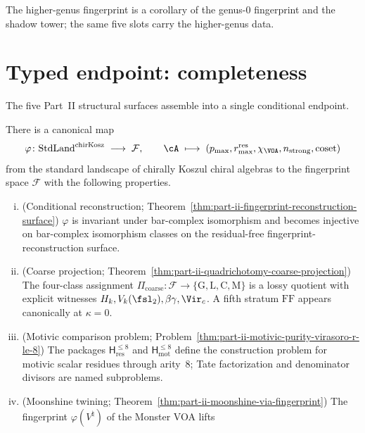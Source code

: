 The higher-genus fingerprint is a corollary of the genus-$0$
fingerprint and the shadow tower; the same five slots carry the
higher-genus data.

\section{Typed endpoint: completeness}
\label{sec:part-ii-platonic-endpoint}

The five Part~II structural surfaces assemble into a single
conditional endpoint.

\begin{theorem}
\label{thm:part-ii-platonic-completeness}
There is a canonical map
\begin{equation}
 \varphi\colon \mathrm{StdLand}^{\mathrm{chirKosz}}
 \;\longrightarrow\; \mathcal{F},
 \qquad \cA \;\longmapsto\;
 (p_{\max}, r_{\max}^{\mathrm{res}}, \chi_{\VOA}, n_{\mathrm{strong}},
 \mathrm{coset})
\end{equation}
from the standard landscape of chirally Koszul chiral algebras to
the fingerprint space $\mathcal{F}$ with the following properties.
\begin{enumerate}[(i)]
\item \textup{(}Conditional reconstruction;
 Theorem~\ref{thm:part-ii-fingerprint-reconstruction-surface}\textup{)}
 $\varphi$ is invariant under bar-complex isomorphism and becomes
 injective on bar-complex isomorphism classes on the residual-free
 fingerprint-reconstruction surface.
 \item \textup{(}Coarse projection;
 Theorem~\ref{thm:part-ii-quadrichotomy-coarse-projection}\textup{)}
 The four-class assignment
 $\Pi_{\mathrm{coarse}}: \mathcal{F} \to \{\mathrm{G}, \mathrm{L},
 \mathrm{C}, \mathrm{M}\}$ is a lossy quotient with explicit
 witnesses $H_k, V_k(\fsl_2), \beta\gamma, \Vir_c$. A fifth
 stratum $\mathrm{FF}$ appears canonically at $\kappa = 0$.
 \item \textup{(}Motivic comparison problem;
 Problem~\ref{thm:part-ii-motivic-purity-virasoro-r-le-8}\textup{)}
 The packages $\mathsf H_{\mathrm{res}}^{\le8}$ and
 $\mathsf H_{\mathrm{mot}}^{\le8}$ define the construction problem
 for motivic scalar residues through arity~$8$; Tate factorization and
 denominator divisors are named subproblems.
 \item \textup{(}Moonshine twining;
 Theorem~\ref{thm:part-ii-moonshine-via-fingerprint}\textup{)}
 The fingerprint $\varphi(V^\natural)$ of the Monster VOA lifts

\end{enumerate}
\end{theorem}
